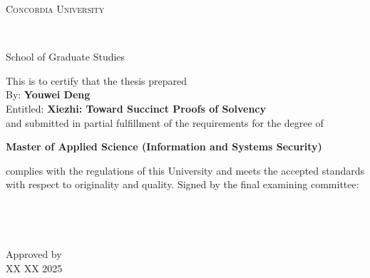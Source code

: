 
\thispagestyle{empty} %

\begin{center}\begin{Large} \textsc{Concordia University} \end{Large} \\
\begin{large} School of Graduate Studies \end{large} \end{center}
\vfill
This is to certify that the thesis prepared\\
By: \tab   \textbf{Youwei Deng} \\
Entitled: \tab \textbf{Xiezhi: Toward Succinct Proofs of Solvency}\\
 and submitted in partial fulfillment of the requirements for the degree of
\begin{center}
\textbf{Master of Applied Science (Information and Systems Security)}
\end{center}
complies with the regulations of this University and meets the
accepted standards with respect to originality and quality.
\vfill
\noindent Signed by the final examining committee: \\[1.3em]
\hspace*{1cm} \raisebox{-0.9em}{\rlap{\it \small }}\hrulefill {} \\[1.3em]
\hspace*{1cm} \hrulefill {} \\[1.3em]
\hspace*{1cm} \hrulefill {} \\[1.3em]
\hspace*{1cm} \hrulefill {} \\[1.3em]
\vfill
\noindent Approved by \raisebox{-0.9em}{\rlap{\it}}\hrulefill \\[1.3em]
\noindent XX XX 2025 \raisebox{-0.9em}{\rlap{\it }}\hrulefill \\
